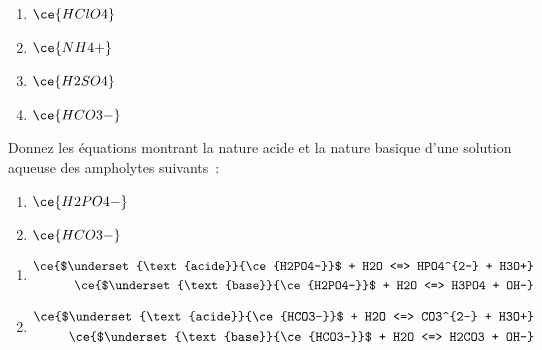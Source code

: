 \documentclass[
  11pt,
  french,
  a4paper,
  openany]{book}
\providecommand{\tightlist}{%
  \setlength{\itemsep}{0pt}\setlength{\parskip}{0pt}}
\begin{document}
\begin{Answer}

\begin{enumerate}
\def\labelenumi{\alph{enumi}.}
\tightlist
\item
  \(\ce{HClO4}\)
\item
  \(\ce{NH4+}\)
\item
  \(\ce{H2SO4}\)
\item
  \(\ce{HCO3-}\)
\end{enumerate}


\end{Answer}

\begin{Exercise}

Donnez les équations montrant la nature acide et la nature basique d'une solution aqueuse des ampholytes suivants~:

\begin{enumerate}
\def\labelenumi{\alph{enumi}.}
\tightlist
\item
  \(\ce{H2PO4-}\)
\item
  \(\ce{HCO3-}\)
\end{enumerate}


\end{Exercise}

\begin{Answer}

\begin{enumerate}
\def\labelenumi{\alph{enumi}.}
\tightlist
\item
  \[
  \begin{split}
    \ce{$\underset{\text{acide}}{\ce{H2PO4-}}$ + H2O <=> HPO4^{2-} + H3O+} \\
    \ce{$\underset{\text{base}}{\ce{H2PO4-}}$ + H2O <=> H3PO4 + OH-} \\
  \end{split}
  \]
\item
  \[
  \begin{split}
    \ce{$\underset{\text{acide}}{\ce{HCO3-}}$ + H2O <=> CO3^{2-} + H3O+} \\
    \ce{$\underset{\text{base}}{\ce{HCO3-}}$ + H2O <=> H2CO3 + OH-} \\
  \end{split}
  \]
\end{enumerate}


\end{Answer}
\end{document}

